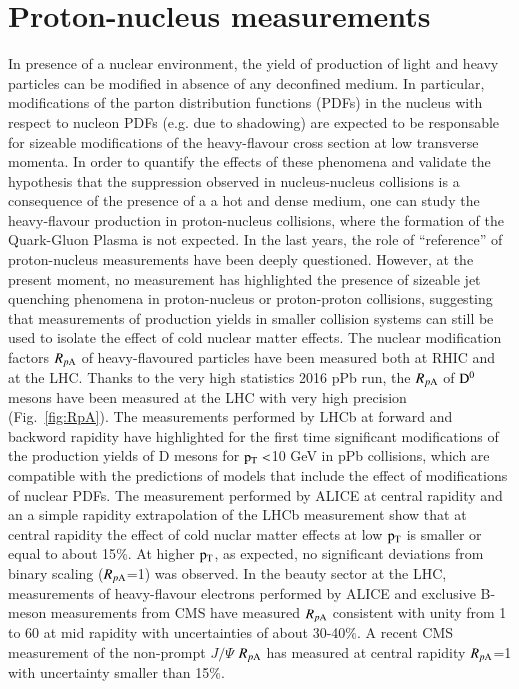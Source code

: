 \documentclass{webofc}
\begin{document}
\section{Proton-nucleus measurements}
\label{pAmeasurements}
In presence of a nuclear environment, the yield of production of light and heavy particles can be modified in absence of any deconfined medium. In particular, modifications of the 
parton distribution functions (PDFs) in the nucleus with respect to nucleon PDFs (e.g. due to shadowing) are expected to be responsable for sizeable modifications of the heavy-flavour cross section at 
low transverse momenta. In order to quantify the effects of these phenomena and validate the hypothesis that the suppression observed in nucleus-nucleus collisions is a consequence of the presence of a a hot and dense medium, 
one can study the heavy-flavour production in proton-nucleus collisions, where the formation of the Quark-Gluon Plasma is not expected. In the last years, the role of ``reference'' of proton-nucleus measurements have been deeply questioned. 
However, at the present moment, no measurement has highlighted the presence of sizeable jet quenching phenomena in proton-nucleus or proton-proton collisions, suggesting that measurements of production yields in smaller 
collision systems can still be used to isolate the effect of cold nuclear matter effects.
The nuclear modification factors $R_{p \mathrm{A}}$ of heavy-flavoured particles have been measured both at RHIC and at the LHC. Thanks to the very high statistics 2016 pPb run, the $R_{p \mathrm{A}}$ of $\rm D^{0}$
mesons have been measured at the LHC with very high precision (Fig.~\ref{fig:RpA}). The measurements performed by LHCb at forward and backword rapidity have highlighted for the first time significant modifications of the production 
yields of D mesons for $\rm p_{\rm T} <$10 GeV in pPb collisions, which are compatible with the predictions of models that include the effect of modifications of nuclear PDFs. 
The measurement performed by ALICE at central rapidity and an a simple rapidity extrapolation of the LHCb measurement 
show that at central rapidity the effect of cold nuclar matter effects at low $\rm p_{\rm T} $ is smaller or equal to about 15$\%$. At higher $\rm p_{\rm T} $, as expected, no significant deviations
from binary scaling ($R_{p \mathrm{A}}$=1) was observed.  In the beauty sector at the LHC, measurements of heavy-flavour electrons performed by ALICE and exclusive B-meson measurements from CMS have measured $R_{p \mathrm{A}}$ consistent with 
unity from 1 to 60 \GeVc at mid rapidity with uncertainties of about 30-40$\%$. A recent CMS measurement of the non-prompt $J/\Psi$ $R_{p \mathrm{A}}$ has measured at central rapidity $R_{p \mathrm{A}}$=1 with uncertainty smaller than 15$\%$. 
\end{document}
